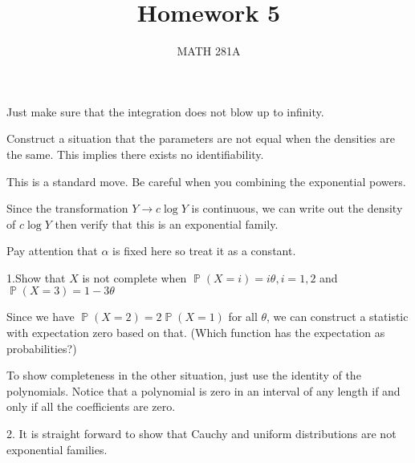 \documentclass[12pt]{article}
\newenvironment{exercise}[2][Exercise]{\begin{trivlist}
\item[\hskip \labelsep {\bfseries #1}\hskip \labelsep {\bfseries #2.}]}{\end{trivlist}}
\renewcommand{\P}{\operatorname{\mathbb{P}}}
\begin{document}
\title{Homework 5}%
\author{MATH 281A} %
\maketitle
\begin{exercise}{5.1}
\end{exercise}

Just make sure that the integration does not blow up to infinity. 

\begin{exercise}{5.2}
\end{exercise}

Construct a situation that the parameters are not equal when the densities are the same. This implies there exists no identifiability.

\begin{exercise}{5.31}
\end{exercise}

This is a standard move. Be careful when you combining the exponential powers.

\begin{exercise}{5.32}
\end{exercise}

Since the transformation $Y \rightarrow c\log Y$ is continuous, we can write out the density of $c\log Y$ then verify that this is an exponential family.

Pay attention that $\alpha$ is fixed here so treat it as a constant.

\begin{exercise}{Extra}
\end{exercise}

1.Show that $X$ is not complete when $\P (X = i) = i\theta, i=1,2$ and $\P(X = 3) = 1-3\theta$

Since we have $\P(X =2) = 2 \P (X=1)$ for all $\theta$, we can construct a statistic with expectation zero based on that. (Which function has the expectation as probabilities?)

To show completeness in the other situation, just use the identity of the polynomials. Notice that a polynomial is zero in an interval of any length if and only if all the coefficients are zero. 

2. It is straight forward to show that Cauchy and uniform distributions are not exponential families.
\end{document}
